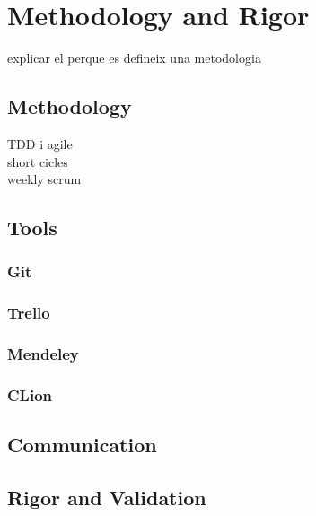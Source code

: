 \chapter{Methodology and Rigor} %

\label{Chapter4} %

explicar el perque es defineix una metodologia

\section{Methodology}
TDD i agile\\
short cicles\\
weekly scrum\\

\section{Tools}
\subsection{Git}
\subsection{Trello}
\subsection{Mendeley}
\subsection{CLion}

\section{Communication}

\section{Rigor and Validation}